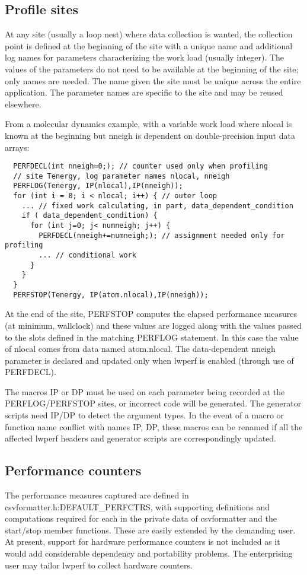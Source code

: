 \documentclass{article}
\begin{document}
\subsection{Profile sites}
At any site (usually a loop nest) where data collection is wanted, the collection point is defined at the beginning of the site with a unique name and additional log names for parameters characterizing the work load (usually integer). The values of the parameters do not need to be available at the beginning of the site; only names are needed. The name given the site must be unique across the entire application. The parameter names are specific to the site and may be reused elsewhere.

From a molecular dynamics example, with a variable work load where nlocal is known at the beginning but nneigh is dependent on double-precision input data arrays:
\begin{verbatim}
  PERFDECL(int nneigh=0;); // counter used only when profiling
  // site Tenergy, log parameter names nlocal, nneigh
  PERFLOG(Tenergy, IP(nlocal),IP(nneigh)); 
  for (int i = 0; i < nlocal; i++) { // outer loop
    ... // fixed work calculating, in part, data_dependent_condition
    if ( data_dependent_condition) {
      for (int j=0; j< numneigh; j++) {
        PERFDECL(nneigh+=numneigh;); // assignment needed only for profiling
        ... // conditional work
      }
    }
  }
  PERFSTOP(Tenergy, IP(atom.nlocal),IP(nneigh));
\end{verbatim}

At the end of the site, PERFSTOP computes the elapsed performance measures (at minimum, wallclock) and these values are logged along with the values passed to the slots defined in the matching PERFLOG statement. In this case the value of nlocal comes from data named atom.nlocal. The data-dependent nneigh parameter is declared and updated only when lwperf is enabled (through use of PERFDECL).

The macros IP or DP must be used on each parameter being recorded at the PERFLOG/PERFSTOP sites, or incorrect code will be generated. The generator scripts need IP/DP to detect the argument types. In the event of a macro or function name conflict with names IP, DP, these macros can be renamed if all the affected lwperf headers and generator scripts are correspondingly updated.

\subsection{Performance counters}
The performance measures captured are defined in csvformatter.h:DEFAULT\_PERFCTRS, with supporting definitions and computations required for each in the private data of csvformatter and the start/stop member functions. These are easily extended by the demanding user. At present, support for hardware performance counters is not included as it would add considerable dependency and portability problems. The enterprising user may tailor lwperf to collect hardware counters.
\end{document}
